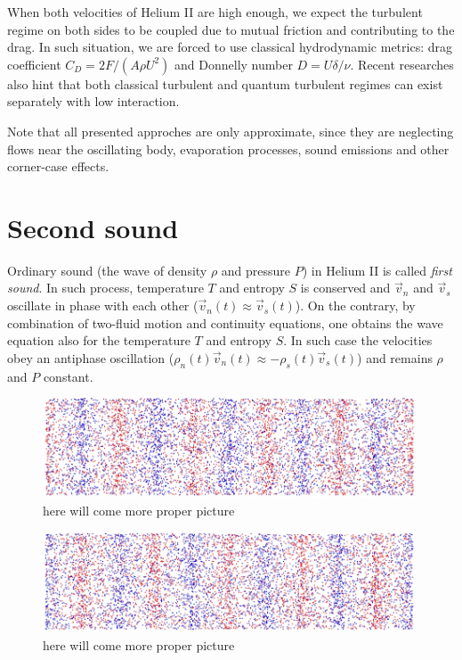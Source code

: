 When both velocities of Helium II are high enough, we expect the turbulent regime on both sides to be coupled due to mutual friction and contributing to the drag. In such situation, we are forced to use classical hydrodynamic metrics: drag coefficient $C_D = 2F / (A\rho U^2)$ and Donnelly number $D = U \delta / \nu$. Recent researches also hint that both classical turbulent and quantum turbulent regimes can exist separately with low interaction.

Note that all presented approches are only approximate, since they are neglecting flows near the oscillating body, evaporation processes, sound emissions and other corner-case effects.

\section{Second sound}

Ordinary sound (the wave of density $\rho$ and pressure $P$) in Helium II is called \textit{first sound}. In such process, temperature $T$ and entropy $S$ is conserved and $\vec{v}_n$ and $\vec{v}_s$ oscillate in phase with each other ($\vec{v}_n(t) \approx \vec{v}_s(t)$). On the contrary, by combination of two-fluid motion and continuity equations, one obtains the wave equation also for the temperature $T$ and entropy $S$. In such case the velocities obey an antiphase oscillation ($\rho_n(t) \vec{v}_n(t) \approx - \rho_s(t) \vec{v}_s(t)$) and remains $\rho$ and $P$ constant.

\begin{figure}[h]
	\centering
	\includegraphics[width=0.99\textwidth]{graphics/theory/ss_1}
	\caption{here will come more proper picture}
	\label{ss_1}
\end{figure}

\begin{figure}[h]
	\centering
	\includegraphics[width=0.99\textwidth]{graphics/theory/ss_2}
	\caption{here will come more proper picture}
	\label{ss_2}
\end{figure}

